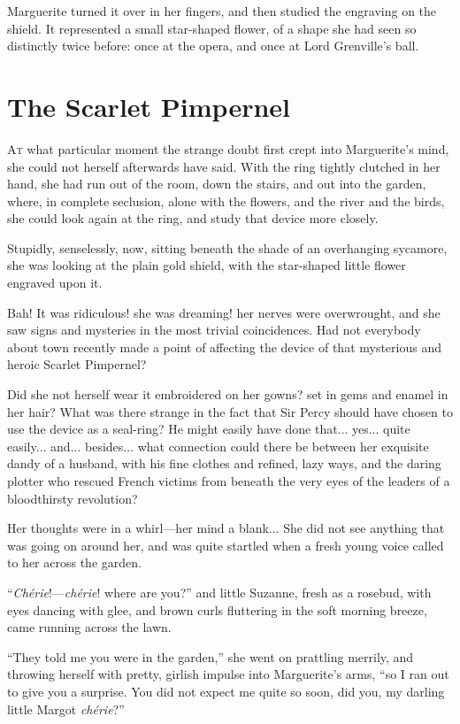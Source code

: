 \documentclass[paper=a5,BCOR=7mm,twoside,DIV=calc,12pt,usegeometry,chapterprefix,endperiod,headings=big]{scrbook}
\begin{document}
Marguerite turned it over in her fingers, and then studied the engraving on the shield. It represented a small star-shaped flower, of a shape she had seen so distinctly twice before: once at the opera, and once at Lord Grenville's ball.

\chapter{The Scarlet Pimpernel}
\lettrine[lines=4]{A}{t} what particular moment the strange doubt first crept into Marguerite's mind, she could not herself afterwards have said. With the ring tightly clutched in her hand, she had run out of the room, down the stairs, and out into the garden, where, in complete seclusion, alone with the flowers, and the river and the birds, she could look again at the ring, and study that device more closely.

Stupidly, senselessly, now, sitting beneath the shade of an overhanging sycamore, she was looking at the plain gold shield, with the star-shaped little flower engraved upon it.

Bah! It was ridiculous! she was dreaming! her nerves were overwrought, and she saw signs and mysteries in the most trivial coincidences. Had not everybody about town recently made a point of affecting the device of that mysterious and heroic Scarlet Pimpernel?

Did she not herself wear it embroidered on her gowns? set in gems and enamel in her hair? What was there strange in the fact that Sir Percy should have chosen to use the device as a seal-ring? He might easily have done that... yes... quite easily... and... besides... what connection could there be between her exquisite dandy of a husband, with his fine clothes and refined, lazy ways, and the daring plotter who rescued French victims from beneath the very eyes of the leaders of a bloodthirsty revolution?

Her thoughts were in a whirl---her mind a blank... She did not see anything that was going on around her, and was quite startled when a fresh young voice called to her across the garden.

\enquote{\textit{Chérie}!---\textit{chérie}! where are you?} and little Suzanne, fresh as a rosebud, with eyes dancing with glee, and brown curls fluttering in the soft morning breeze, came running across the lawn.

\enquote{They told me you were in the garden,} she went on prattling merrily, and throwing herself with pretty, girlish impulse into Marguerite's arms, \enquote{so I ran out to give you a surprise. You did not expect me quite so soon, did you, my darling little Margot \textit{chérie}?}
\end{document}
